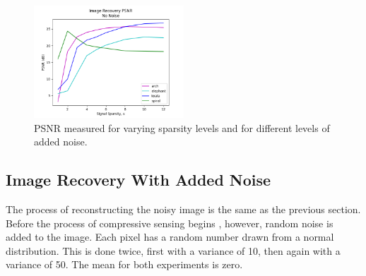 \documentclass{article}
\begin{document}
\begin{figure}[h]
    \captionsetup{width=.5\linewidth}
    \centering
        \includegraphics[width=0.5\textwidth]{plots/d3-no-noise.png}
        \caption{PSNR measured for varying sparsity levels and for different levels of added noise.}
\end{figure}




\newpage
\subsection*{Image Recovery With Added Noise}

The process of reconstructing the noisy image is the same as the previous section.
Before the process of compressive sensing begins , however, random noise is added to the image.
Each pixel has a random number drawn from a normal distribution.
This is done twice, first with a variance of 10, then again with a variance of 50.
The mean for both experiments is zero.
\end{document}
